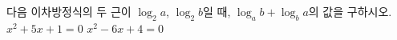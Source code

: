 다음 이차방정식의 두 근이 $\log_2 a$, $\log_2 b$일 때, $\log_a b+\log_b a$의 값을 구하시오.
 $x^2+5x+1=0$
 $x^2-6x+4=0$
